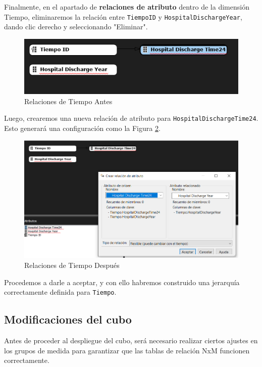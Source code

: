 \documentclass[12pt, a4paper, twoside]{article}
\begin{document}
Finalmente, en el apartado de \textbf{relaciones de atributo} dentro de la dimensión Tiempo, eliminaremos la relación entre \texttt{TiempoID} y \texttt{HospitalDischargeYear}, dando clic derecho y seleccionando "Eliminar".

\begin{figure}[H]
	\centering
	\includegraphics[width=1\textwidth]{image/relacionesTiempoDps1}
	\caption{Relaciones de Tiempo Antes}
	\label{fig:26}
\end{figure}

Luego, crearemos una nueva relación de atributo para \texttt{HospitalDischargeTime24}. Esto generará una configuración como la Figura \ref{fig:27}.

\begin{figure}[H]
	\centering
	\includegraphics[width=1\textwidth]{image/relacionesTiempoDps2}
	\caption{Relaciones de Tiempo Después}
	\label{fig:27}
\end{figure}

Procedemos a darle a aceptar, y con ello habremos construido una jerarquía correctamente definida para \texttt{Tiempo}.


\subsection{Modificaciones del cubo}

Antes de proceder al despliegue del cubo, será necesario realizar ciertos ajustes en los grupos de medida para garantizar que las tablas de relación NxM funcionen correctamente. 
\end{document}
